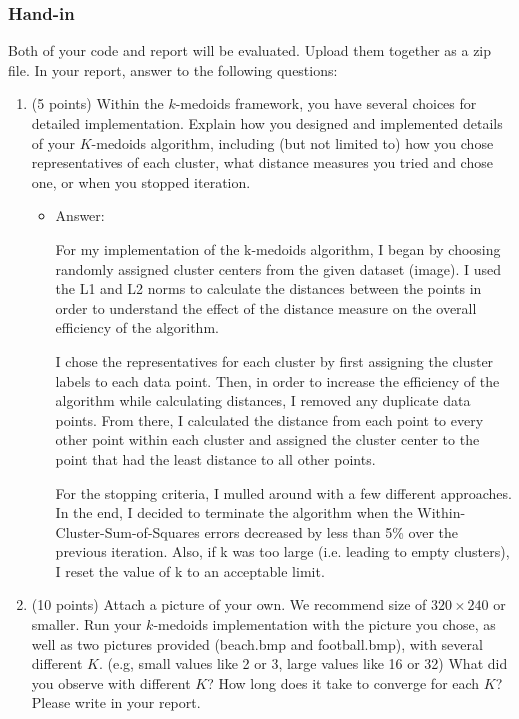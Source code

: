 \documentclass[twoside,10pt]{article}
\begin{document}
\subsubsection*{Hand-in}
Both of your code and report will be evaluated. Upload them together as a zip file. In your report, answer to the following questions:
\begin{enumerate}
  \item (5 points) Within the $k$-medoids framework, you have several choices for detailed implementation. Explain how you designed and implemented details of your $K$-medoids algorithm, including (but not limited to) how you chose representatives of each cluster, what distance measures you tried and chose one, or when you stopped iteration.
  \begin{itemize}
  \item Answer:
  
  For my implementation of the k-medoids algorithm, I began by choosing randomly assigned cluster centers from the given dataset (image). I used the L1 and L2 norms to calculate the distances between the points in order to understand the effect of the distance measure on the overall efficiency of the algorithm.
  
  I chose the representatives for each cluster by first assigning the cluster labels to each data point. Then, in order to increase the efficiency of the algorithm while calculating distances, I removed any duplicate data points. From there, I calculated the distance from each point to every other point within each cluster and assigned the cluster center to the point that had the least distance to all other points.
  
  For the stopping criteria, I mulled around with a few different approaches. In the end, I decided to terminate the algorithm when the Within-Cluster-Sum-of-Squares errors decreased by less than 5\% over the previous iteration. Also, if k was too large (i.e. leading to empty clusters), I reset the value of k to an acceptable limit.
  
  \end{itemize}
  
  \item (10 points) Attach a picture of your own. We recommend size of $320 \times 240$ or smaller. Run your $k$-medoids implementation with the picture you chose, as well as two pictures provided (\textsf{beach.bmp} and \textsf{football.bmp}), with several different $K$. (e.g, small values like 2 or 3, large values like 16 or 32) What did you observe with different $K$? How long does it take to converge for each $K$? Please write in your report.
  

\end{enumerate}
\end{document}

